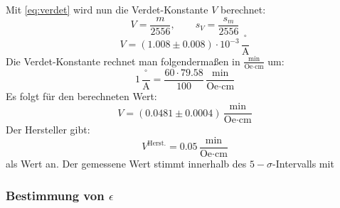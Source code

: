 Mit \autoref{eq:verdet} wird nun die Verdet-Konstante $V$ berechnet:
\begin{equation}
  V = \frac{m}{2556}, \qquad s_V = \frac{s_m}{2556}
\end{equation}
\begin{equation}
  V = (1.008 \pm 0.008) \cdot 10^{-3}\,\frac{{}^\circ}{\text{A}}
\end{equation}
Die Verdet-Konstante rechnet man folgendermaßen in $\frac{\text{min}}{\text{Oe}\cdot \text{cm}}$ um:
\begin{equation}
  1\,\frac{{}^\circ}{\text{A}} = \frac{60\cdot 79.58}{100}\,\frac{\text{min}}{\text{Oe}\cdot \text{cm}}
\end{equation}
Es folgt für den berechneten Wert:
\begin{equation}
  V = (0.0481 \pm 0.0004)\,\frac{\text{min}}{\text{Oe}\cdot \text{cm}}
\end{equation}
Der Hersteller gibt:
\begin{equation}
  V^{\text{Herst.}} = 0.05\,\frac{\text{min}}{\text{Oe}\cdot \text{cm}}
\end{equation}
als Wert an. Der gemessene Wert stimmt innerhalb des $5-\sigma$-Intervalls mit 



\subsubsection{Bestimmung von $\epsilon$}
